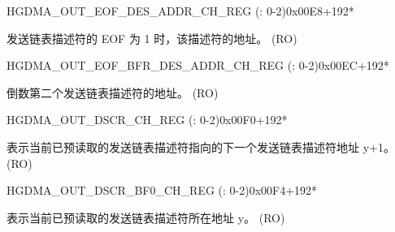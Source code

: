 \begin{register}{H}{GDMA\_OUT\_EOF\_DES\_ADDR\_CH\_REG (: 0-2)}{0x00E8+192*}\label{regdesc:GDMAOUTEOFDESADDRCHNREG}
%
\regnewline%
\begin{regdesc}\begin{reglist}
\label{fielddesc:GDMAOUTEOFDESADDRCHN}\item [GDMA\_OUT\_EOF\_DES\_ADDR\_CH\regindex{n}] 发送链表描述符的 EOF 为 1 时，该描述符的地址。 (RO)
\end{reglist}\end{regdesc}
\end{register}


\begin{register}{H}{GDMA\_OUT\_EOF\_BFR\_DES\_ADDR\_CH\_REG (: 0-2)}{0x00EC+192*}\label{regdesc:GDMAOUTEOFBFRDESADDRCHNREG}
%
\regnewline%
\begin{regdesc}\begin{reglist}
\label{fielddesc:GDMAOUTEOFBFRDESADDRCHN}\item [GDMA\_OUT\_EOF\_BFR\_DES\_ADDR\_CH\regindex{n}] 倒数第二个发送链表描述符的地址。 (RO)
\end{reglist}\end{regdesc}
\end{register}


\begin{register}{H}{GDMA\_OUT\_DSCR\_CH\_REG (: 0-2)}{0x00F0+192*}\label{regdesc:GDMAOUTDSCRCHNREG}
%
\regnewline%
\begin{regdesc}\begin{reglist}
\label{fielddesc:GDMAOUTLINKDSCRCHN}\item [GDMA\_OUTLINK\_DSCR\_CH\regindex{n}] 表示当前已预读取的发送链表描述符指向的下一个发送链表描述符地址 y+1。 (RO)
\end{reglist}\end{regdesc}
\end{register}


\begin{register}{H}{GDMA\_OUT\_DSCR\_BF0\_CH\_REG (: 0-2)}{0x00F4+192*}\label{regdesc:GDMAOUTDSCRBF0CHNREG}
%
\regnewline%
\begin{regdesc}\begin{reglist}
\label{fielddesc:GDMAOUTLINKDSCRBF0CHN}\item [GDMA\_OUTLINK\_DSCR\_BF0\_CH\regindex{n}] 表示当前已预读取的发送链表描述符所在地址 y。 (RO)
\end{reglist}\end{regdesc}
\end{register}


